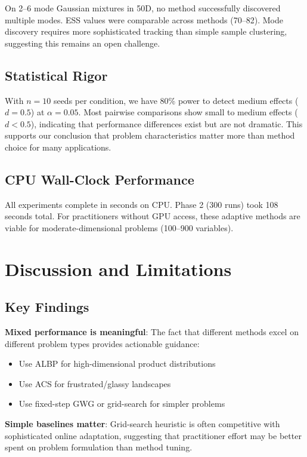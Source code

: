 \documentclass{article}
\begin{document}
On 2--6 mode Gaussian mixtures in 50D, no method successfully discovered multiple modes. ESS values were comparable across methods (70--82). Mode discovery requires more sophisticated tracking than simple sample clustering, suggesting this remains an open challenge.

\subsection{Statistical Rigor}

With $n=10$ seeds per condition, we have 80\% power to detect medium effects ($d=0.5$) at $\alpha=0.05$. Most pairwise comparisons show small to medium effects ($d < 0.5$), indicating that performance differences exist but are not dramatic. This supports our conclusion that problem characteristics matter more than method choice for many applications.

\subsection{CPU Wall-Clock Performance}

All experiments complete in seconds on CPU. Phase 2 (300 runs) took 108 seconds total. For practitioners without GPU access, these adaptive methods are viable for moderate-dimensional problems (100--900 variables).

\section{Discussion and Limitations}
\label{sec:discussion}

\subsection{Key Findings}

\textbf{Mixed performance is meaningful}: The fact that different methods excel on different problem types provides actionable guidance:
\begin{itemize}
    \item Use ALBP for high-dimensional product distributions
    \item Use ACS for frustrated/glassy landscapes
    \item Use fixed-step GWG or grid-search for simpler problems
\end{itemize}

\textbf{Simple baselines matter}: Grid-search heuristic is often competitive with sophisticated online adaptation, suggesting that practitioner effort may be better spent on problem formulation than method tuning.
\end{document}
